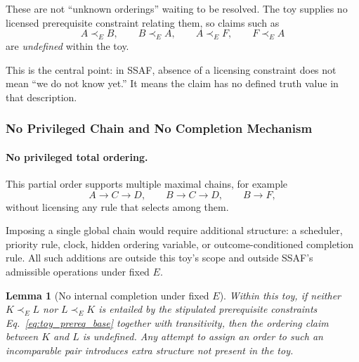 \documentclass[aps,prx,onecolumn,11pt]{revtex4-2}
\theoremstyle{plain}
\newtheorem{lemma}{Lemma}
\theoremstyle{definition}
\theoremstyle{remark}
\begin{document}
These are not ``unknown orderings'' waiting to be resolved. The toy
supplies no licensed prerequisite constraint relating them, so claims
such as
\[
A\prec_E B,
\qquad
B\prec_E A,
\qquad
A\prec_E F,
\qquad
F\prec_E A
\]
are \emph{undefined} within the toy.

This is the central point: in SSAF, absence of a licensing constraint
does not mean ``we do not know yet.'' It means the claim has no defined
truth value in that description.

\subsubsection{No Privileged Chain and No Completion Mechanism}
\label{toy:nontotal_ordering:no_chain}

\paragraph{No privileged total ordering.}

This partial order supports multiple maximal chains, for example
\[
A\to C\to D,
\qquad
B\to C\to D,
\qquad
B\to F,
\]
without licensing any rule that selects among them.

Imposing a single global chain would require additional structure: a
scheduler, priority rule, clock, hidden ordering variable, or
outcome-conditioned completion rule. All such additions are outside
this toy's scope and outside SSAF's admissible operations under fixed
\(E\).

\begin{lemma}[No internal completion under fixed \(E\)]
\label{lem:toy_no_completion}
Within this toy, if neither \(K\prec_E L\) nor \(L\prec_E K\) is
entailed by the stipulated prerequisite constraints
Eq.~\eqref{eq:toy_prereq_base} together with transitivity, then the
ordering claim between \(K\) and \(L\) is undefined. Any attempt to
assign an order to such an incomparable pair introduces extra structure
not present in the toy.
\end{lemma}
\end{document}

